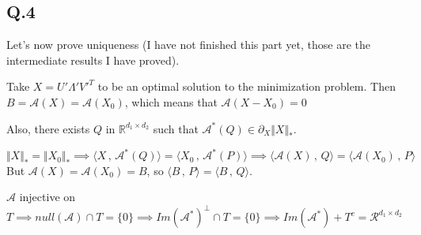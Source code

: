 \documentclass[12pt]{article}
\newcommand{\Q}[1]{\subsection*{Q.#1}}
\newenvironment{question}[1]
{\Q{#1}}{}
\newcommand{\nucnorm}[1]{\Vert #1 \Vert_*}
\newcommand{\inner}[2]{\langle #1 \, , \, #2 \rangle}
\begin{document}
\begin{question}{4}
\begin{enumerate}
    Let's now prove uniqueness (I have not finished this part yet, those are the intermediate results I have proved).
    
    Take $X = U'\Lambda' {V'}^T$ to be an optimal solution to the minimization problem.
    Then $B = \mathcal A(X) = \mathcal A(X_0)$, which means that $\mathcal A(X - X_0) = 0$

    Also, there exists $Q$ in $\mathbb R^{d_1 \times d_2}$ such that $\mathcal A^*(Q) \in \partial_X \nucnorm{X}$.
    
    $\nucnorm{X} = \nucnorm{X_0} \implies \inner{X}{\mathcal A^*(Q)} = \inner{X_0}{\mathcal A^*(P)} \implies \inner{\mathcal A(X)}{Q} = \inner{\mathcal A(X_0)}{P}$
    But $\mathcal A(X) = \mathcal A(X_0) = B$, so $\inner{B}{P} = \inner{B}{Q}$.

    $\mathcal A$ injective on $T \implies null(\mathcal A) \cap T = \{0\} \implies Im(\mathcal A^*)^{\perp} \cap T = \{0\} \implies Im(\mathcal A^*) + T^c = \mathcal R^{d_1 \times d_2}$
    
\end{enumerate}
\end{question}
\end{document}
